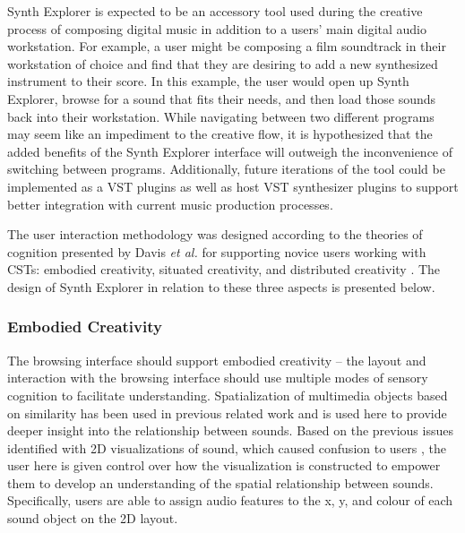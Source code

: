 Synth Explorer is expected to be an accessory tool used during the creative process of composing digital music in addition to a users' main digital audio workstation. For example, a user might be composing a film soundtrack in their workstation of choice and find that they are desiring to add a new synthesized instrument to their score. In this example, the user would open up Synth Explorer, browse for a sound that fits their needs, and then load those sounds back into their workstation. While navigating between two different programs may seem like an impediment to the creative flow, it is hypothesized that the added benefits of the Synth Explorer interface will outweigh the inconvenience of switching between programs. Additionally, future iterations of the tool could be implemented as a VST plugins as well as host VST synthesizer plugins to support better integration with current music production processes.

The user interaction methodology was designed according to the theories of cognition presented by Davis \textit{et al.} for supporting novice users working with CSTs: embodied creativity, situated creativity, and distributed creativity \cite{davis2013toward}. The design of Synth Explorer in relation to these three aspects is presented below.

\subsubsection{Embodied Creativity}
The browsing interface should support embodied creativity -- the layout and interaction with the browsing interface should use multiple modes of sensory cognition to facilitate understanding. Spatialization of multimedia objects based on similarity has been used in previous related work \cite{10.1145/3325480.3325506} and is used here to provide deeper insight into the relationship between sounds. Based on the previous issues identified with 2D visualizations of sound, which caused confusion to users \cite{turquois2016exploring}, the user here is given control over how the visualization is constructed to empower them to develop an understanding of the spatial relationship between sounds. Specifically, users are able to assign audio features to the x, y, and colour of each sound object on the 2D layout.

